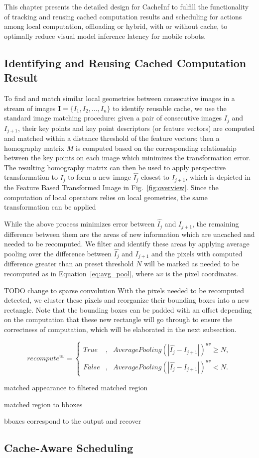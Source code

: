 This chapter presents the detailed design for CacheInf to fulfill the functionality of tracking and reusing cached computation results and scheduling for actions among local computation, offloading or hybrid, with or without cache, to optimally reduce visual model inference latency for mobile robots.

\subsection{Identifying and Reusing Cached Computation Result}
To find and match similar local geometries between consecutive images in a stream of images $\textbf{I}=\{I_1, I_2, ..., I_n\}$ to identify reusable cache, we use the standard image matching procedure: given a pair of consecutive images $I_j$ and $I_{j+1}$, their key points and key point descriptors (or feature vectors) are computed and matched within a distance threshold of the feature vectors; then a homography matrix $M$ is computed based on the corresponding relationship between the key points on each image which minimizes the transformation error.
The resulting homography matrix can then be used to apply perspective transformation to $I_j$ to form a new image $\hat{I_j}$ closest to $I_{j+1}$, which is depicted in the Feature Based Transformed Image in Fig.~\ref{fig:overview}.
Since the computation of local operators relies on local geometries, the same transformation can be applied 

While the above process minimizes error between $\hat{I_j}$ and $I_{j+1}$, the remaining difference between them are the areas of new information which are uncached and needed to be recomputed.
We filter and identify these areas by applying average pooling over the difference between $\hat{I_j}$ and $I_{j+1}$ and the pixels with computed difference greater than an preset threshold $N$ will be marked as needed to be recomputed as in Equation~\ref{eq:avg_pool}, where $uv$ is the pixel coordinates.

TODO change to sparse convolution
With the pixels needed to be recomputed detected, we cluster these pixels and reorganize their bounding boxes into a new rectangle. 
Note that the bounding boxes can be padded with an offset depending on the computation that these new rectangle will go through to ensure the correctness of computation, which will be elaborated in the next subsection.

\begin{equation}
    recompute^{uv}=\left\{
        \begin{aligned}
        True & , & AveragePooling(|\hat{I_j} - I_{j+1}|)^{uv} \geq N, \\
        False & , & AveragePooling(|\hat{I_j} - I_{j+1}|)^{uv} < N.
        \end{aligned}
    \right. 
    \label{eq:avg_pool}
\end{equation}




matched appearance to filtered matched region 

matched region to bboxes 

bboxes correspond to the output and recover


\subsection{Cache-Aware Scheduling}